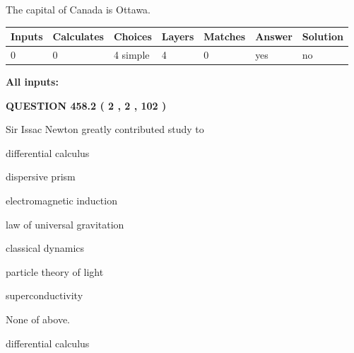 \documentclass[12pt]{article}
\begin{document}
 
The capital of Canada is Ottawa.
 
 
\noindent{}
 
 
   
   
   
   
\noindent\begin{tabular}{|l|l|l|l|l|l|l|}
 \hline
Inputs & Calculates & Choices & Layers & Matches & Answer & Solution \\ \hline
 0  & 
 0  & 
 4
  simple  
  & 
 4  & 
 0  & 
  yes & 
  no 
  \\ \hline
 \end{tabular}
   
   
   
   
\noindent{}
   
   
   
   
\noindent\vspace{0.1in}\hspace{-0.08in} {\textbf{\Large{All inputs: }}}
   
   
  
\vspace{0.2in}
  
{\textbf{\Large{QUESTION
458.2 
 ( 2 , 2 , 102 )
}}}
  
  
Sir Issac Newton greatly contributed study to
 
 
differential calculus
 
 
dispersive prism
 
 
electromagnetic induction
 
 
law of universal gravitation
 
 
classical dynamics
 
 
particle theory of light
 
 
superconductivity
 
 
 None of above.
 
 
\noindent{}
 
 
differential calculus
 
\end{document}
